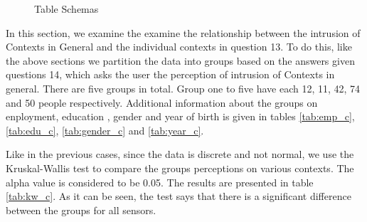 \begin{figure}[htp]
\caption{Table Schemas}
\label{fig:co3}
\end{figure}

In this section, we examine the examine the relationship between the intrusion of Contexts in General and the individual contexts in question 13.
To do this, like the above sections we partition the data into groups based on the answers given questions 14, which asks the user the perception of intrusion of Contexts in general. There are five groups in total. Group one to five have each 12, 11, 42, 74 and 50 people respectively. Additional
information about the groups on enployment, education , gender and year of birth is given in tables \ref{tab:emp_c}, \ref{tab:edu_c}, \ref{tab:gender_c} and \ref{tab:year_c}. 

Like in the previous cases, since the data is discrete and not normal, we use the Kruskal-Wallis test to compare the groups perceptions on various contexts. The alpha value is considered to be 0.05. The results are presented in table \ref{tab:kw_c}. As it can be seen, the test says that there is a significant difference between the groups for all sensors.

